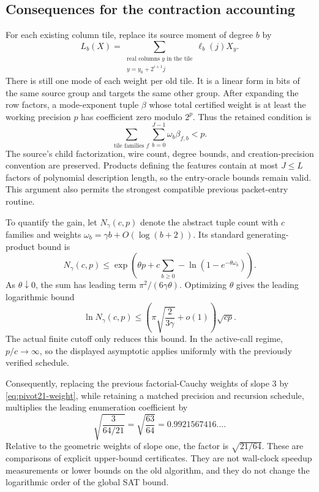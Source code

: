 \subsection{Consequences for the contraction accounting}

For each existing column tile, replace its source moment of degree $b$
by
\[
 L_b(X)=\sum_{\substack{\text{real columns }y\text{ in the tile}\\
                        y=y_0+2^{i+1}j}}
               \ell_b(j)X_y.
\]
There is still one mode of each weight per old tile. It is a linear
form in bits of the same source group and targets the same other group.
After expanding the row factors, a mode-exponent tuple $\beta$ whose
total certified weight is at least the working precision $p$ has
coefficient zero modulo $2^p$. Thus the retained condition is
\[
 \sum_{\text{tile families }f}\sum_{b=0}^{J-1}
             \omega_b\beta_{f,b}<p.
\]
The source's child factorization, wire count, degree bounds, and
creation-precision convention are preserved. Products defining the
features contain at most $J\le L$ factors of polynomial description
length, so the entry-oracle bounds remain valid. This argument also
permits the strongest compatible previous packet-entry routine.

To quantify the gain, let $N_\gamma(c,p)$ denote the abstract tuple
count with $c$ families and weights
$\omega_b=\gamma b+O(\log(b+2))$. Its standard generating-product
bound is
\[
 N_\gamma(c,p)\le
 \exp\!\left(\theta p+
       c\sum_{b\ge0}-\ln(1-e^{-\theta\omega_b})\right).
\]
As $\theta\downarrow0$, the sum has leading term
$\pi^2/(6\gamma\theta)$. Optimizing $\theta$ gives the leading
logarithmic bound
\[
 \ln N_\gamma(c,p)\le
 \left(\pi\sqrt{\frac{2}{3\gamma}}+o(1)\right)\sqrt{cp}.
\]
The actual finite cutoff only reduces this bound. In the active-call
regime, $p/c\to\infty$, so the displayed asymptotic applies uniformly
with the previously verified schedule.

Consequently, replacing the previous factorial-Cauchy weights of slope
$3$ by \eqref{eq:pivot21-weight}, while retaining a matched precision
and recursion schedule, multiplies the leading enumeration coefficient by
\begin{equation}
 \sqrt{\frac{3}{64/21}}=\sqrt{\frac{63}{64}}
   =0.9921567416\ldots.
 \label{eq:pivot21-ratio}
\end{equation}
Relative to the geometric weights of slope one, the factor is
$\sqrt{21/64}$. These are comparisons of explicit upper-bound
certificates. They are not wall-clock speedup measurements or lower
bounds on the old algorithm, and they do not change the logarithmic
order of the global SAT bound.

